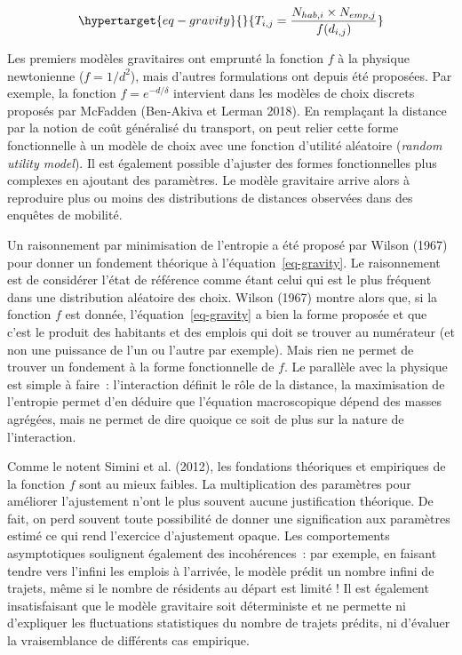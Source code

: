 \documentclass[
  10pt,
  a4paper,
  numbers=noendperiod,
  DIV=9]{scrreprt}
\begin{document}
\begin{equation}\protect\hypertarget{eq-gravity}{}{
T_{i,j} = \frac {N_{hab, i}\times N_{emp, j}} {f(d_{i,j})}
}\label{eq-gravity}\end{equation}

Les premiers modèles gravitaires ont emprunté la fonction \(f\) à la
physique newtonienne (\(f=1/d^2\)), mais d'autres formulations ont
depuis été proposées. Par exemple, la fonction \(f=e^{-d/\delta}\)
intervient dans les modèles de choix discrets proposés par McFadden
(Ben-Akiva et Lerman 2018). En remplaçant la distance par la notion de
coût généralisé du transport, on peut relier cette forme fonctionnelle à
un modèle de choix avec une fonction d'utilité aléatoire (\emph{random
utility model}). Il est également possible d'ajuster des formes
fonctionnelles plus complexes en ajoutant des paramètres. Le modèle
gravitaire arrive alors à reproduire plus ou moins des distributions de
distances observées dans des enquêtes de mobilité.

Un raisonnement par minimisation de l'entropie a été proposé par Wilson
(1967) pour donner un fondement théorique à l'équation~\ref{eq-gravity}.
Le raisonnement est de considérer l'état de référence comme étant celui
qui est le plus fréquent dans une distribution aléatoire des choix.
Wilson (1967) montre alors que, si la fonction \(f\) est donnée,
l'équation~\ref{eq-gravity} a bien la forme proposée et que c'est le
produit des habitants et des emplois qui doit se trouver au numérateur
(et non une puissance de l'un ou l'autre par exemple). Mais rien ne
permet de trouver un fondement à la forme fonctionnelle de \(f\). Le
parallèle avec la physique est simple à faire~: l'interaction définit le
rôle de la distance, la maximisation de l'entropie permet d'en déduire
que l'équation macroscopique dépend des masses agrégées, mais ne permet
de dire quoique ce soit de plus sur la nature de l'interaction.

Comme le notent Simini et al. (2012), les fondations théoriques et
empiriques de la fonction \(f\) sont au mieux faibles. La multiplication
des paramètres pour améliorer l'ajustement n'ont le plus souvent aucune
justification théorique. De fait, on perd souvent toute possibilité de
donner une signification aux paramètres estimé ce qui rend l'exercice
d'ajustement opaque. Les comportements asymptotiques soulignent
également des incohérences~: par exemple, en faisant tendre vers
l'infini les emplois à l'arrivée, le modèle prédit un nombre infini de
trajets, même si le nombre de résidents au départ est limité ! Il est
également insatisfaisant que le modèle gravitaire soit déterministe et
ne permette ni d'expliquer les fluctuations statistiques du nombre de
trajets prédits, ni d'évaluer la vraisemblance de différents cas
empirique.
\end{document}
